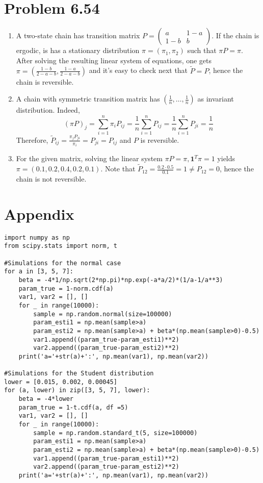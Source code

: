 \documentclass[a4paper,11pt]{article}
\begin{document}
\section*{Problem 6.54}
\begin{enumerate}
  \item A two-state chain has transition matrix $P =\begin{pmatrix}
    a & 1-a\\
    1-b & b
  \end{pmatrix}$. If the chain is ergodic, is has a stationary distribution $\pi=(\pi_1,\pi_2)$ such that $\pi P = \pi$. After solving the resulting linear system of equations, one gets $\pi = (\frac{1-b}{2-a-b}, \frac{1-a}{2-a-b})$ and it's easy to check next that $\tilde P = P$, hence the chain is reversible.
  \item A chain with symmetric transition matrix has $(\frac 1n, \ldots, \frac 1n)$ as invariant distribution. Indeed, $$(\pi P)_j = \sum_{i=1}^n \pi_i P_{ij} = \frac 1n \sum_{i=1}^n P_{ij} = \frac 1n \sum_{i=1}^n P_{ji}= \frac 1n$$
  Therefore, $\tilde P_{ij} = \frac{\pi_j P_{ji}}{\pi_i}= P_{ji} = P_{ij}$ and $P$ is reversible.
  \item For the given matrix, solving the linear system $\pi P = \pi, \mathbf 1^T\pi = 1$ yields $\pi=(0.1,0.2,0.4,0.2,0.1)$. Note that $\tilde P_{12} = \frac{0.2\cdot 0.5}{0.1} = 1 \neq P_{12}= 0$, hence the chain is not reversible.
 \end{enumerate}


\section*{Appendix}
\begin{verbatim}
import numpy as np
from scipy.stats import norm, t 

#Simulations for the normal case
for a in [3, 5, 7]:
    beta = -4*1/np.sqrt(2*np.pi)*np.exp(-a*a/2)*(1/a-1/a**3)
    param_true = 1-norm.cdf(a)
    var1, var2 = [], []
    for _ in range(10000):
        sample = np.random.normal(size=100000)
        param_esti1 = np.mean(sample>a)
        param_esti2 = np.mean(sample>a) + beta*(np.mean(sample>0)-0.5)
        var1.append((param_true-param_esti1)**2)
        var2.append((param_true-param_esti2)**2)
    print('a='+str(a)+':', np.mean(var1), np.mean(var2))

#Simulations for the Student distribution
lower = [0.015, 0.002, 0.00045]
for (a, lower) in zip([3, 5, 7], lower):
    beta = -4*lower
    param_true = 1-t.cdf(a, df =5)
    var1, var2 = [], []
    for _ in range(10000):
        sample = np.random.standard_t(5, size=100000)
        param_esti1 = np.mean(sample>a)
        param_esti2 = np.mean(sample>a) + beta*(np.mean(sample>0)-0.5)
        var1.append((param_true-param_esti1)**2)
        var2.append((param_true-param_esti2)**2)
    print('a='+str(a)+':', np.mean(var1), np.mean(var2))
    
\end{verbatim}
\end{document}
